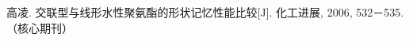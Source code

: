 
\begin{publications}{99}

    \item\textsc{高凌}. {交联型与线形水性聚氨酯的形状记忆性能比较}[J].
      化工进展, 2006, 532－535.（核心期刊）
    
\end{publications}
